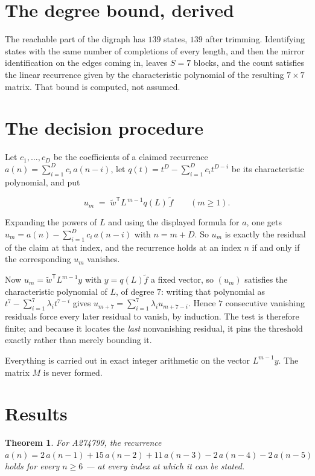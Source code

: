\documentclass[11pt]{article}
\newtheorem{theorem}{Theorem}
\theoremstyle{definition}
\begin{document}
\section{The degree bound, derived}

The reachable part of the digraph has $139$ states, $139$ after trimming. Identifying states with the same number of completions of every length, and then the mirror identification on the edges coming in, leaves $S = 7$ blocks, and the count satisfies the linear recurrence given by the characteristic polynomial of the resulting $7\times7$ matrix. That bound is computed, not assumed.

\section{The decision procedure}

Let $c_1,\dots,c_D$ be the coefficients of a claimed recurrence $a(n) = \sum_{i=1}^{D} c_i\,a(n-i)$, let $q(t) = t^{D} - \sum_{i=1}^{D} c_i t^{D-i}$ be its characteristic polynomial, and put

\[u_m \;=\; \tilde w^{\mathsf T} L^{\,m-1} q(L)\,\tilde f \qquad (m \ge 1).\]

Expanding the powers of $L$ and using the displayed formula for $a$, one gets $u_m = a(n) - \sum_{i=1}^{D} c_i\,a(n-i)$ with $n = m + D$. So $u_m$ is exactly the residual of the claim at that index, and the recurrence holds at an index $n$ if and only if the corresponding $u_m$ vanishes.

Now $u_m = \tilde w^{\mathsf T} L^{m-1} y$ with $y = q(L)\tilde f$ a fixed vector, so $(u_m)$ satisfies the characteristic polynomial of $L$, of degree $7$: writing that polynomial as $t^{7} - \sum_{i=1}^{7} \lambda_i t^{7-i}$ gives $u_{m+7} = \sum_{i=1}^{7} \lambda_i u_{m+7-i}$. Hence $7$ consecutive vanishing residuals force every later residual to vanish, by induction. The test is therefore finite; and because it locates the {\itshape last} nonvanishing residual, it pins the threshold exactly rather than merely bounding it.

Everything is carried out in exact integer arithmetic on the vector $L^{m-1}y$. The matrix $M$ is never formed.

\section{Results}

\begin{theorem} For A274799, the recurrence $a(n) = 2\,a(n-1) + 15\,a(n-2) + 11\,a(n-3) - 2\,a(n-4) - 2\,a(n-5)$ holds for every $n \ge 6$ --- at every index at which it can be stated.\end{theorem}
\end{document}
